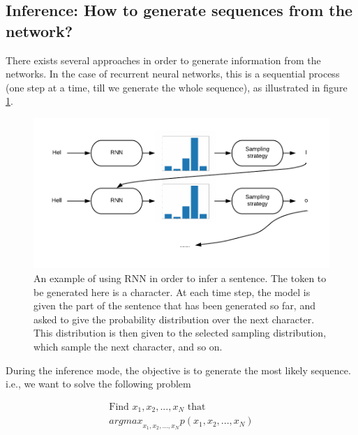 \subsection{Inference: How to generate sequences from the network?}
\par There exists several approaches in order to generate information from the networks. In the case of recurrent neural networks, this is a sequential process (one step at a time, till we generate the whole sequence), as illustrated in figure \ref{fig:text_gen}.

\begin{figure}
    \centering
    \includegraphics{images/gbem/text_gen.png}
    \caption{An example of using RNN in order to infer a sentence. The token to be generated here is a character. At each time step, the model is given the part of the sentence that has been generated so far, and asked to give the probability distribution over the next character. This distribution is then given to the selected sampling distribution, which sample the next character, and so on.}
    \label{fig:text_gen}
\end{figure}

During the inference mode, the objective is to generate the most likely sequence. i.e., we want to solve the following problem

\begin{equation}
    \begin{split}
    \textrm{Find $x_1, x_2, ..., x_N$ that }\\
    {argmax}_{x_1, x_2, ..., x_N}p(x_1, x_2, ..., x_N)
    \label{eq:rnn_obj_inf}
    \end{split}
\end{equation}

